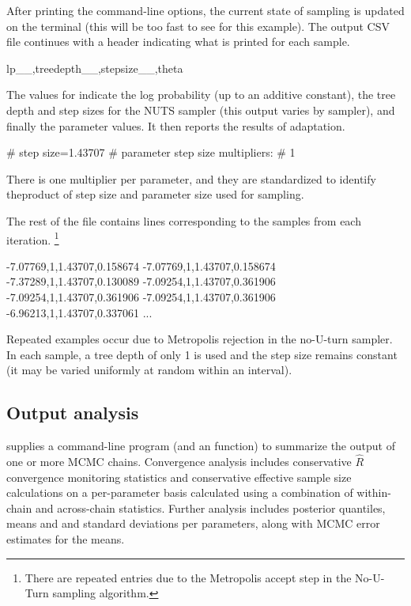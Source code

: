 \documentclass[article]{jss}
\begin{document}
After printing the command-line options, the current state of sampling
is updated on the terminal (this will be too fast to see for this
example).  The output CSV file continues with a header indicating what
is printed for each sample.
%
\begin{Code}
lp__,treedepth__,stepsize__,theta
\end{Code}
%
The values for  indicate the log probability (up to an
additive constant), the tree depth and step sizes for the NUTS sampler
(this output varies by sampler), and finally the parameter values.
It then reports the results of adaptation.
%
\begin{Code}
# step size=1.43707
# parameter step size multipliers:
# 1
\end{Code}
%
There is one multiplier per parameter, and they are standardized to
identify theproduct of step size and parameter size used for sampling.

The rest of the file contains lines corresponding to the
samples from each iteration.%
%
\footnote{There are repeated entries due to the Metropolis accept step
in the No-U-Turn sampling algorithm.}
%
%
\begin{Code}
-7.07769,1,1.43707,0.158674
-7.07769,1,1.43707,0.158674
-7.37289,1,1.43707,0.130089
-7.09254,1,1.43707,0.361906
-7.09254,1,1.43707,0.361906
-7.09254,1,1.43707,0.361906
-6.96213,1,1.43707,0.337061
...
\end{Code}
%
Repeated examples occur due to Metropolis rejection in the no-U-turn
sampler.  In each sample, a tree depth of only 1 is used and the step
size remains constant (it may be varied uniformly at random within an
interval).

\subsection{Output analysis}

 supplies a command-line program (and  an
  function) to summarize the output of one or
more MCMC chains.  Convergence analysis includes conservative
$\hat{R}$ convergence monitoring statistics and conservative effective
sample size calculations on a per-parameter basis calculated using a
combination of within-chain and across-chain statistics.  Further
analysis includes posterior quantiles, means and and standard
deviations per parameters, along with MCMC error estimates for the
means.
\end{document}
